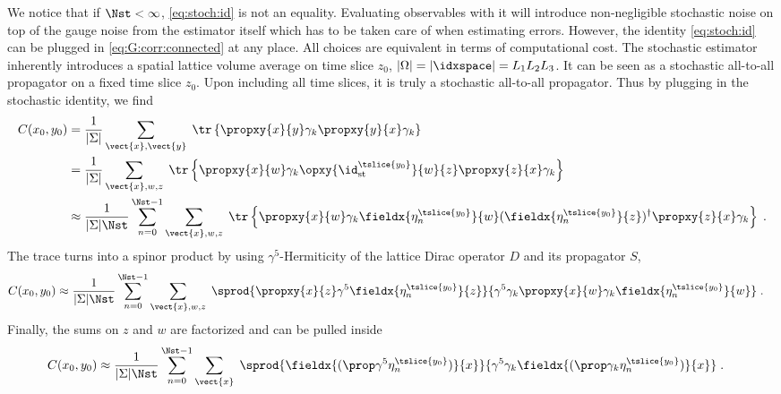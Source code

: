 We notice that if $\Nst < \infty$, \cref{eq:stoch:id} is not an equality.
Evaluating observables with it will introduce non-negligible stochastic noise on top of the gauge noise from the estimator itself which has to be taken care of when estimating errors.
However, the identity \cref{eq:stoch:id} can be plugged in \cref{eq:G:corr:connected} at any place.
All choices are equivalent in terms of computational cost.
The stochastic estimator inherently introduces a spatial lattice volume average on time slice $z_0$, \ie $\lvert \Omega \rvert = \lvert \idxspace \rvert = L_1 L_2 L_3$.
It can be seen as a stochastic all-to-all propagator on a fixed time slice $z_0$.
Upon including all time slices, it is truly a stochastic all-to-all propagator.
Thus by plugging in the stochastic identity, we find
\begin{align}
C(x_0, y_0)
&= \frac{1}{ \lvert \Sigma \rvert } \sum_{\vect{x}, \vect{y}} \;
\tr \left\{ \propxy{x}{y} \gamma_k \propxy{y}{x} \gamma_k \right\} \\
&= \frac{1}{ \lvert \Sigma \rvert } \sum_{\vect{x}, w, z} \;
\tr \left\{
  \propxy{x}{w} \gamma_k
  \opxy{\id^{\tslice{y_0}}_{\text{st}}}{w}{z}
  \propxy{z}{x} \gamma_k
\right\} \\
&\approx \frac{1}{ \lvert \Sigma \rvert  \Nst} \sum_{n=0}^{\Nst-1} \sum_{\vect{x}, w, z} \;
\tr \left\{
  \propxy{x}{w} \gamma_k
  \fieldx{\eta_n^{\tslice{y_0}}}{w}
  (\fieldx{\eta_n^{\tslice{y_0}}}{z})^{\dagger}
  \propxy{z}{x} \gamma_k
\right\} \;.
\end{align}
The trace turns into a spinor product by using $\gamma^{5}$-Hermiticity of the lattice Dirac operator $D$ and its propagator $S$,
\begin{align}
C(x_0, y_0)
&\approx \frac{1}{ \lvert \Sigma \rvert \Nst} \sum_{n=0}^{\Nst-1} \sum_{\vect{x}, w, z} \;
\sprod{
  \propxy{x}{z}
  \gamma^{5}
  \fieldx{\eta_n^{\tslice{y_0}}}{z}
}{
  \gamma^{5}
  \gamma_k
  \propxy{x}{w}
  \gamma_k
  \fieldx{\eta_n^{\tslice{y_0}}}{w}
} \;.
\end{align}
Finally, the sums on $z$ and $w$ are factorized and can be pulled inside
\begin{align} \label{eq:stoch:C:full}
C(x_0, y_0)
&\approx \frac{1}{ \lvert \Sigma \rvert \Nst} \sum_{n=0}^{\Nst-1} \sum_{\vect{x}} \;
\sprod{
  \fieldx{(\prop
  \gamma^{5}
  \eta_n^{\tslice{y_0}})}{x}
}{
  \gamma^{5}
  \gamma_k
  \fieldx{(\prop \gamma_k
  \eta_n^{\tslice{y_0}})}{x}
} \;.
\end{align}
